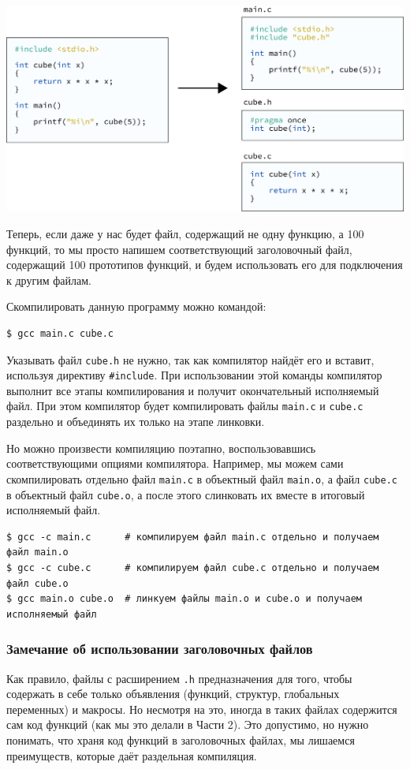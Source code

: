 \documentclass{article}
\begin{document}
\begin{center}
\includegraphics[scale=0.85]{../images/06main_cube_separate3.png}
\end{center}
Теперь, если даже у нас будет файл, содержащий не одну функцию, а 100 функций, то мы просто напишем соответствующий заголовочный файл, содержащий 100 прототипов функций, и будем использовать его для подключения к другим файлам.

\noindent Скомпилировать данную программу можно командой:
\begin{lstlisting}[style=csMiptBash]
$ gcc main.c cube.c
\end{lstlisting}
Указывать файл \texttt{cube.h} не нужно, так как компилятор найдёт его и вставит, используя директиву \texttt{\#include}.
При использовании этой команды компилятор выполнит все этапы компилирования и получит окончательный исполняемый файл. При этом компилятор будет компилировать файлы \texttt{main.c} и \texttt{cube.c} раздельно и объединять их только на этапе линковки.

Но можно произвести компиляцию поэтапно, воспользовавшись соответствующими опциями компилятора. Например, мы можем сами скомпилировать отдельно файл \texttt{main.c} в объектный файл \texttt{main.o}, а файл \texttt{cube.c} в объектный файл \texttt{cube.o}, а после этого слинковать их вместе в итоговый исполняемый файл.
\begin{lstlisting}[style=csMiptBash]
$ gcc -c main.c      # компилируем файл main.c отдельно и получаем файл main.o
$ gcc -c cube.c      # компилируем файл cube.c отдельно и получаем файл cube.o
$ gcc main.o cube.o  # линкуем файлы main.o и cube.o и получаем исполняемый файл
\end{lstlisting}

\subsubsection*{Замечание об использовании заголовочных файлов}
Как правило, файлы с расширением \texttt{.h} предназначения для того, чтобы содержать в себе только объявления (функций, структур, глобальных переменных) и макросы. Но несмотря на это, иногда в таких файлах содержится сам код функций (как мы это делали в Части 2). Это допустимо, но нужно понимать, что храня код функций в заголовочных файлах, мы лишаемся преимуществ, которые даёт раздельная компиляция.
\end{document}
